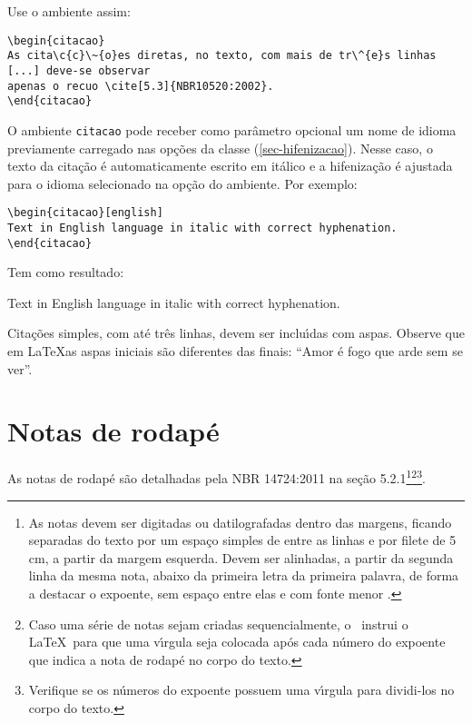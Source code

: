 Use o ambiente assim:

\begin{verbatim}
\begin{citacao}
As cita\c{c}\~{o}es diretas, no texto, com mais de tr\^{e}s linhas [...] deve-se observar
apenas o recuo \cite[5.3]{NBR10520:2002}.
\end{citacao}
\end{verbatim}

O ambiente \texttt{citacao} pode receber como par\^{a}metro opcional um nome de
idioma previamente carregado nas op\c{c}\~{o}es da classe (\autoref{sec-hifenizacao}). Nesse
caso, o texto da cita\c{c}\~{a}o \'{e} automaticamente escrito em it\'{a}lico e a hifeniza\c{c}\~{a}o \'{e}
ajustada para o idioma selecionado na op\c{c}\~{a}o do ambiente. Por exemplo:

\begin{verbatim}
\begin{citacao}[english]
Text in English language in italic with correct hyphenation.
\end{citacao}
\end{verbatim}

Tem como resultado:

\begin{citacao}[english]
Text in English language in italic with correct hyphenation.
\end{citacao}

Cita\c{c}\~{o}es simples, com at\'{e} tr\^{e}s linhas, devem ser
inclu\'{\i}das com aspas. Observe que em \LaTeX as aspas iniciais s\~{a}o diferentes das
finais: ``Amor \'{e} fogo que arde sem se ver''.

\section{Notas de rodap\'{e}}

As notas de rodap\'{e} s\~{a}o detalhadas pela NBR 14724:2011 na se\c{c}\~{a}o 5.2.1\footnote{As
notas devem ser digitadas ou datilografadas dentro das margens, ficando
separadas do texto por um espa\c{c}o simples de entre as linhas e por filete de 5
cm, a partir da margem esquerda. Devem ser alinhadas, a partir da segunda linha
da mesma nota, abaixo da primeira letra da primeira palavra, de forma a destacar
o expoente, sem espa\c{c}o entre elas e com fonte menor
.}\footnote{Caso uma s\'{e}rie de notas sejam
criadas sequencialmente, o \abnTeX\ instrui o \LaTeX\ para que uma v\'{\i}rgula seja
colocada ap\'{o}s cada n\'{u}mero do expoente que indica a nota de rodap\'{e} no corpo do
texto.}\footnote{Verifique se os n\'{u}meros do expoente possuem uma v\'{\i}rgula para
dividi-los no corpo do texto.}.


